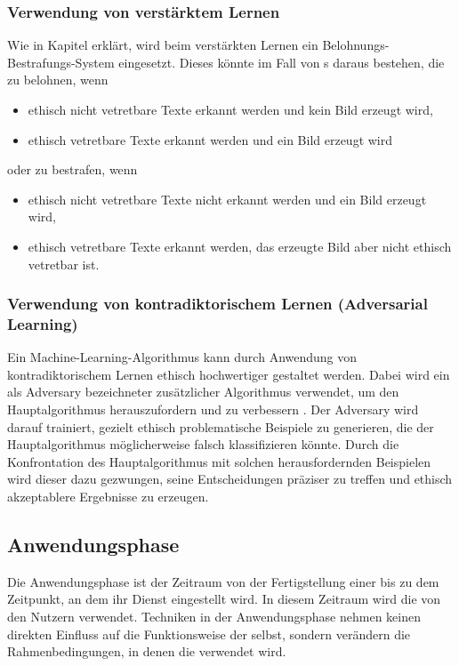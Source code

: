 \documentclass[hidelinks,12pt]{report}
\begin{document}
\subsubsection{Verwendung von verstärktem Lernen}
Wie in Kapitel  erklärt, wird beim verstärkten Lernen ein Belohnungs-Bestrafungs-System eingesetzt. Dieses könnte im Fall von s daraus bestehen, die  zu belohnen, wenn 
\\
\begin{itemize}
	\item ethisch nicht vetretbare Texte erkannt werden und kein Bild erzeugt wird,
	\item ethisch vetretbare Texte erkannt werden und ein Bild erzeugt wird
\end{itemize}
oder zu bestrafen, wenn
\\
\begin{itemize}
	\item ethisch nicht vetretbare Texte nicht erkannt werden und ein Bild erzeugt wird,
	\item ethisch vetretbare Texte erkannt werden, das erzeugte Bild aber nicht ethisch vetretbar ist.
\end{itemize}  

\subsubsection{Verwendung von kontradiktorischem Lernen (Adversarial Learning)}
Ein Machine-Learning-Algorithmus kann durch Anwendung von kontradiktorischem Lernen ethisch hochwertiger gestaltet werden. Dabei wird ein als Adversary bezeichneter zusätzlicher Algorithmus verwendet, um den Hauptalgorithmus herauszufordern und zu verbessern \cite[S. 3]{Kurakin}. Der Adversary wird darauf trainiert, gezielt ethisch problematische Beispiele zu generieren, die der Hauptalgorithmus möglicherweise falsch klassifizieren könnte. Durch die Konfrontation des Hauptalgorithmus mit solchen herausfordernden Beispielen wird dieser dazu gezwungen, seine Entscheidungen präziser zu treffen und ethisch akzeptablere Ergebnisse zu erzeugen.
\\
\subsection{Anwendungsphase}
Die Anwendungsphase ist der Zeitraum von der Fertigstellung einer  bis zu dem Zeitpunkt, an dem ihr Dienst eingestellt wird. In diesem Zeitraum wird die  von den Nutzern verwendet. Techniken in der Anwendungsphase nehmen keinen direkten Einfluss auf die Funktionsweise der  selbst, sondern verändern die Rahmenbedingungen, in denen die  verwendet wird.
\\
\end{document}

